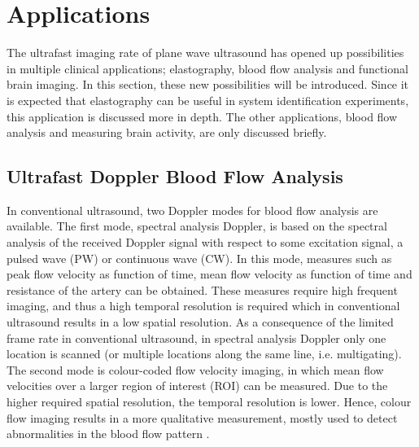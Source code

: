 \section{Applications}
The ultrafast imaging rate of plane wave ultrasound has opened up possibilities in multiple clinical applications; elastography, blood flow analysis and functional brain imaging. In this section, these new possibilities will be introduced. Since it is expected that elastography can be useful in system identification experiments, this application is discussed more in depth. The other applications, blood flow analysis and measuring brain activity, are only discussed briefly. 



\subsection{Ultrafast Doppler Blood Flow Analysis}
In conventional ultrasound, two Doppler modes for blood flow analysis are available. The first mode, spectral analysis Doppler, is based on the spectral analysis of the received Doppler signal with respect to some excitation signal, a pulsed wave (PW) or continuous wave (CW). In this mode, measures such as peak flow velocity as function of time, mean flow velocity as function of time and resistance of the artery can be obtained. These measures require high frequent imaging, and thus a high temporal resolution is required which in conventional ultrasound results in a low spatial resolution. As a consequence of the limited frame rate in conventional ultrasound, in spectral analysis Doppler only one location is scanned (or multiple locations along the same line, i.e. multigating). The second mode is colour-coded flow velocity imaging, in which mean flow velocities over a larger region of interest (ROI) can be measured. Due to the higher required spatial resolution, the temporal resolution is lower. Hence, colour flow imaging results in a more qualitative measurement, mostly used to detect abnormalities in the blood flow pattern \cite{tanter_ultrafast_2014}. %

